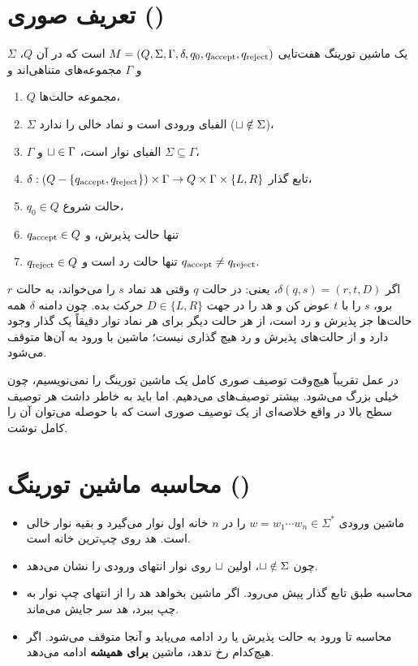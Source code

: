 \section{تعریف صوری ()}

\begin{definition}
یک ماشین تورینگ هفت‌تایی $M=(Q,\Sigma,\Gamma,\delta,q_0,q_{\mathrm{accept}},q_{\mathrm{reject}})$ است که در آن $Q$، $\Sigma$ و $\Gamma$ مجموعه‌های متناهی‌اند و
\begin{enumerate}
\item $Q$ مجموعه حالت‌ها،
\item $\Sigma$ الفبای ورودی است و نماد خالی را ندارد ($\sqcup\notin\Sigma$)،
\item $\Gamma$ الفبای نوار است، $\sqcup\in\Gamma$ و $\Sigma\subseteq\Gamma$،
\item $\delta:(Q-\{q_{\mathrm{accept}},q_{\mathrm{reject}}\})\times\Gamma\to Q\times\Gamma\times\{L,R\}$ تابع گذار،
\item $q_0\in Q$ حالت شروع،
\item $q_{\mathrm{accept}}\in Q$ تنها حالت پذیرش، و
\item $q_{\mathrm{reject}}\in Q$ تنها حالت رد است و $q_{\mathrm{accept}}\neq q_{\mathrm{reject}}$.
\end{enumerate}
\end{definition}

اگر $\delta(q,s)=(r,t,D)$، یعنی: در حالت $q$ وقتی هد نماد $s$ را می‌خواند، به حالت $r$ برو، $s$ را با $t$ عوض کن و هد را در جهت $D\in\{L,R\}$ حرکت بده. چون دامنه $\delta$ همه حالت‌ها جز پذیرش و رد است، از هر حالت دیگر برای هر نماد نوار دقیقاً یک گذار وجود دارد و از حالت‌های پذیرش و رد هیچ گذاری نیست؛ ماشین با ورود به آن‌ها متوقف می‌شود.

\begin{note}
در عمل تقریباً هیچ‌وقت توصیف صوری کامل یک ماشین تورینگ را نمی‌نویسیم، چون خیلی بزرگ می‌شود. بیشتر توصیف‌های  می‌دهیم. اما باید به خاطر داشت هر توصیف سطح بالا در واقع خلاصه‌ای از یک توصیف صوری است که با حوصله می‌توان آن را کامل نوشت.
\end{note}

\section{محاسبه ماشین تورینگ ()}

\begin{itemize}
\item ماشین ورودی $w=w_1\cdots w_n\in\Sigma^*$ را در $n$ خانه اول نوار می‌گیرد و بقیه نوار خالی است. هد روی چپ‌ترین خانه است.
\item چون $\sqcup\notin\Sigma$، اولین $\sqcup$ روی نوار انتهای ورودی را نشان می‌دهد.
\item محاسبه طبق تابع گذار پیش می‌رود. اگر ماشین بخواهد هد را از انتهای چپ نوار به چپ ببرد، هد سر جایش می‌ماند.
\item محاسبه تا ورود به حالت پذیرش یا رد ادامه می‌یابد و آنجا متوقف می‌شود. اگر هیچ‌کدام رخ ندهد، ماشین \textbf{برای همیشه} ادامه می‌دهد.
\end{itemize}

